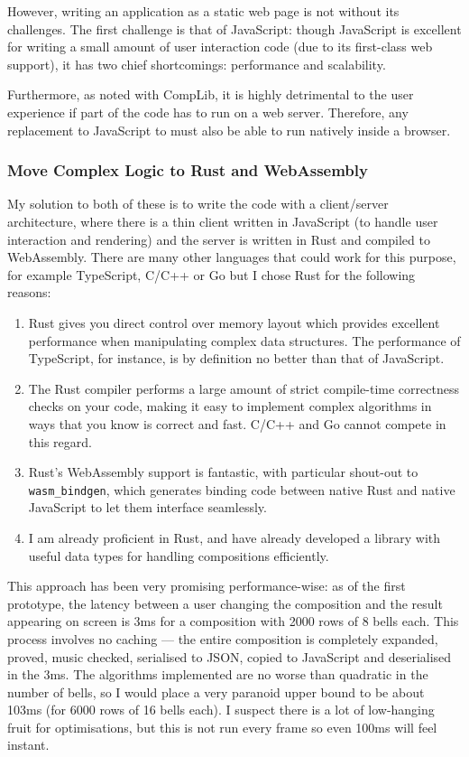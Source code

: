 \documentclass[12pt]{article}
\begin{document}
However, writing an application as a static web page is not without its challenges.  The first
challenge is that of JavaScript: though JavaScript is excellent for writing a small amount of user
interaction code (due to its first-class web support), it has two chief shortcomings: performance
and scalability.

Furthermore, as noted with CompLib, it is highly detrimental to the user experience if part of the
code has to run on a web server.  Therefore, any replacement to JavaScript to must also be able to
run natively inside a browser.

\subsubsection{Move Complex Logic to Rust and WebAssembly}

My solution to both of these is to write the code with a client/server architecture, where there is
a thin client written in JavaScript (to handle user interaction and rendering) and the server is
written in Rust and compiled to WebAssembly.  There are many other languages that could work for
this purpose, for example TypeScript, C/C++ or Go but I chose Rust for the following reasons:

\begin{enumerate}
    \item Rust gives you direct control over memory layout which provides excellent performance when
        manipulating complex data structures.  The performance of TypeScript, for instance, is by
        definition no better than that of JavaScript.
    \item The Rust compiler performs a large amount of strict compile-time correctness checks on
        your code, making it easy to implement complex algorithms in ways that you know is correct
        and fast.  C/C++ and Go cannot compete in this regard.
    \item Rust's WebAssembly support is fantastic, with particular shout-out to \verb|wasm_bindgen|,
        which generates binding code between native Rust and native JavaScript to let them interface
        seamlessly.
    \item I am already proficient in Rust, and have already developed a library with useful
        data types for handling compositions efficiently.
\end{enumerate}

This approach has been very promising performance-wise: as of the first prototype, the latency
between a user changing the composition and the result appearing on screen is 3ms for a composition
with 2000 rows of 8 bells each.  This process involves no caching --- the entire composition is
completely expanded, proved, music checked, serialised to JSON, copied to JavaScript and
deserialised in the 3ms.  The algorithms implemented are no worse than quadratic in the number of
bells, so I would place a very paranoid upper bound to be about 103ms (for 6000 rows of 16 bells
each).  I suspect there is a lot of low-hanging fruit for optimisations, but this is not run every
frame so even 100ms will feel instant.
\end{document}
